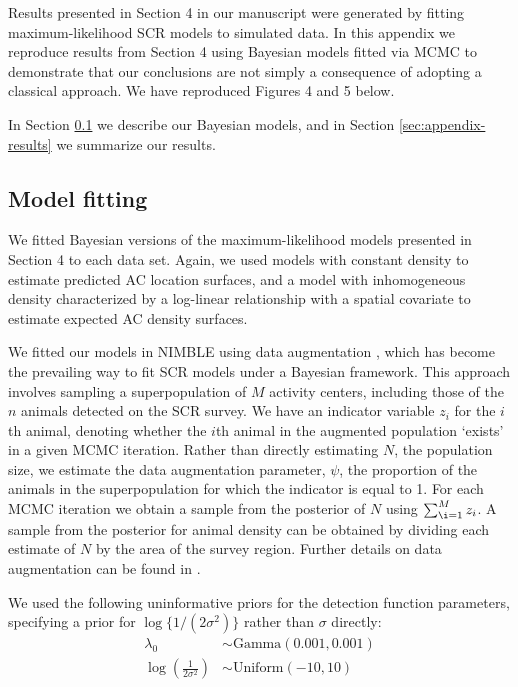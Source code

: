 \documentclass[10pt,a4paper]{article}\usepackage[]{graphicx}\usepackage[]{xcolor}
\begin{document}
Results presented in Section 4 in our manuscript were generated by
fitting maximum-likelihood SCR models to simulated data. In this
appendix we reproduce results from Section 4 using Bayesian models
fitted via MCMC to demonstrate that our conclusions are not simply a
consequence of adopting a classical approach. We have reproduced
Figures 4 and 5 below. 

In Section \ref{sec:appendix-model-fitting} we describe our Bayesian
models, and in Section \ref{sec:appendix-results} we summarize our
results. 

\subsection{Model fitting}
\label{sec:appendix-model-fitting}

We fitted Bayesian versions of the maximum-likelihood models presented
in Section 4 to each data set. Again, we used models with constant
density to estimate predicted AC location surfaces, and a
model with inhomogeneous density characterized by a log-linear
relationship with a spatial covariate to estimate expected AC density
surfaces.

We fitted our models in NIMBLE \citep{deValpine:17, Turek:21} using
data augmentation \citep{Tanner:87}, which has become the prevailing
way to fit SCR models under a Bayesian framework. This approach
involves sampling a superpopulation of $M$ activity centers, including
those of the $n$ animals detected on the SCR survey. We have an
indicator variable $z_i$ for the $i$th animal, denoting whether the
$i$th animal in the augmented population `exists' in a given MCMC
iteration. Rather than directly estimating $N$, the population size,
we estimate the data augmentation parameter, $\psi$, the proportion of
the animals in the superpopulation for which the indicator is equal to
1. For each MCMC iteration we obtain a sample from the posterior of
$N$ using $\sum_{\i = 1}^M z_i$. A sample from the posterior for
animal density can be obtained by dividing each estimate of $N$ by the area of the survey
region. Further details on data augmentation can be found in
\citet[][pp.\ 139--157]{Kery+Schaub:12}.

We used the following uninformative priors for the detection function
parameters, specifying a prior for $\log\{1/(2\sigma^2)\}$ rather than
$\sigma$ directly:
\begin{align*}
  \lambda_0 &\sim \text{Gamma}(0.001, 0.001) \\
  \log\left(\frac{1}{2\sigma^2}\right) &\sim \text{Uniform}(-10, 10)
\end{align*}
\end{document}
